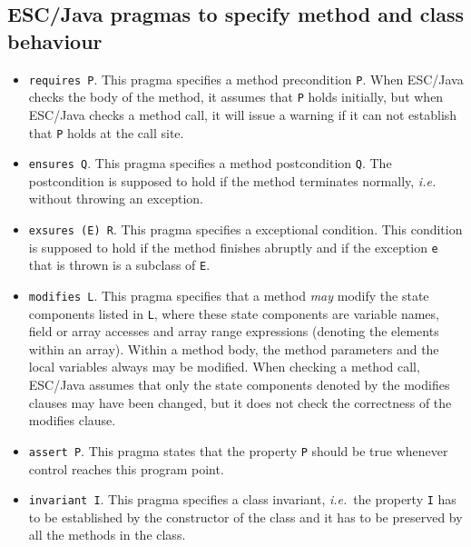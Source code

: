 \documentclass[a4paper]{llncs}
\begin{document}
\subsection{ESC/Java pragmas to specify method and class behaviour}
\begin{itemize}
\item{\texttt{requires P}.}
This pragma specifies a method precondition {\tt P}.
When ESC/Ja\-va checks the body of the
method, it assumes that \texttt{P} holds initially, but when
ESC/Java checks a method call, it will issue a warning if
it can not establish that \texttt{P} holds at the call site.

\item{\texttt{ensures Q}.}
This pragma specifies a method postcondition \texttt{Q}. The
postcondition is supposed to hold if the method terminates normally,
\emph{i.e.}  without throwing an exception.

\item{\texttt{exsures (E) R}.}
This pragma specifies a exceptional condition. This condition is
supposed to hold if the method finishes abruptly and if
the exception \texttt{e} that is thrown is a subclass of \texttt{E}.

\item{\texttt{modifies L}.}
This pragma specifies that a method \emph{may} modify the state
components listed in \texttt{L}, where these state components are
variable names, field or array accesses and array range expressions
(denoting the elements within an array). Within a method body, the
method parameters and the local variables always may be modified. When
checking a method call, ESC/Java assumes that only the state
components denoted by the modifies clauses may have been changed, but it
does not check the correctness of the modifies clause.

\item{\texttt{assert P}.} This pragma states that the property
\texttt{P} should be true whenever control reaches this program point.

\item{\texttt{invariant I}.} This pragma specifies a class invariant,
\emph{i.e.}~the property \texttt{I} has to be established by the
constructor of the class and it has to be preserved by all the
methods in the class. 
\end{itemize}
\end{document}
